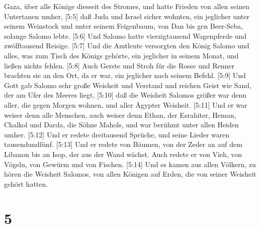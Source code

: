 Gaza, über alle Könige diesseit des Stromes, und hatte Frieden von allen
seinen Untertanen umher,  {[}5:5{]} daß Juda und Israel
sicher wohnten, ein jeglicher unter seinem Weinstock und unter seinem
Feigenbaum, von Dan bis gen Beer-Seba, solange Salomo lebte.
 {[}5:6{]} Und Salomo hatte vierzigtausend Wagenpferde und
zwölftausend Reisige.  {[}5:7{]} Und die Amtleute
versorgten den König Salomo und alles, was zum Tisch des Königs gehörte,
ein jeglicher in seinem Monat, und ließen nichts fehlen. 
{[}5:8{]} Auch Gerste und Stroh für die Rosse und Renner brachten sie an
den Ort, da er war, ein jeglicher nach seinem Befehl. 
{[}5:9{]} Und Gott gab Salomo sehr große Weisheit und Verstand und
reichen Geist wie Sand, der am Ufer des Meeres liegt, 
{[}5:10{]} daß die Weisheit Salomos größer war denn aller, die gegen
Morgen wohnen, und aller Ägypter Weisheit.  {[}5:11{]} Und
er war weiser denn alle Menschen, auch weiser denn Ethan, der Esrahiter,
Heman, Chalkol und Darda, die Söhne Mahols, und war berühmt unter allen
Heiden umher.  {[}5:12{]} Und er redete dreitausend
Sprüche, und seine Lieder waren tausendundfünf.  {[}5:13{]}
Und er redete von Bäumen, von der Zeder an auf dem Libanon bis an Isop,
der aus der Wand wächst. Auch redete er von Vieh, von Vögeln, von Gewürm
und von Fischen.  {[}5:14{]} Und es kamen aus allen
Völkern, zu hören die Weisheit Salomos, von allen Königen auf Erden, die
von seiner Weisheit gehört hatten.

\hypertarget{section-4}{%
\section{5}\label{section-4}}

